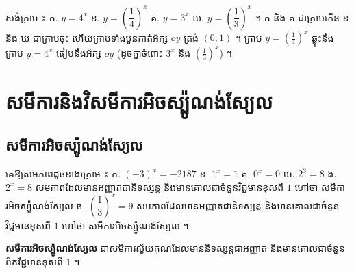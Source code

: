 \begin{pro}
សង់ក្រាប ៖ \quad ក. $y = 4^x$ \quad ខ. $y = \left(\dfrac{1}{4}\right)^x$ \quad គ. $y = 3^x$ \quad ឃ. $y = \left(\dfrac{1}{3}\right)^x$ ។
\ans
ក និង គ ជាក្រាបកើន ខ និង ឃ ជាក្រាបចុះ ហើយក្រាបទាំងបួនកាត់អ័ក្ស $oy$ ត្រង់ $(0, 1)$ ។ ក្រាប $y = \left(\frac{1}{4}\right)^x$ ឆ្លុះនឹងក្រាប $y = 4^x$ ធៀបនឹងអ័ក្ស $oy$ (ដូចគ្នាចំពោះ $3^x$ និង $\left(\frac{1}{3}\right)^x$) ។
\end{pro}

\section{សមីការនិងវិសមីការអិចស្ប៉ូណង់ស្យែល}
\subsection{សមីការអិចស្ប៉ូណង់ស្យែល}
\begin{example}[ឧទាហរណ៍]
គេឱ្យសមភាពដូចខាងក្រោម ៖ ក. $(-3)^x = -2187$ \quad ខ. $1^x = 1$ \quad គ. $0^x = 0$ \quad ឃ. $2^3 = 8$ \quad ង. $2^x = 8$ សមភាពដែលមានអញ្ញាតជានិទស្សន្ត និងមានគោលជាចំនួនវិជ្ជមានខុសពី $1$ ហៅថា សមីការអិចស្ប៉ូណង់ស្យែល \quad ច. $\left(\dfrac{1}{3}\right)^x = 9$ សមភាពដែលមានអញ្ញាតជានិទស្សន្ត និងមានគោលជាចំនួនវិជ្ជមានខុសពី $1$ ហៅថា សមីការអិចស្ប៉ូណង់ស្យែល ។
\end{example}
\begin{definition}[និយមន័យ]
\textbf{សមីការអិចស្ប៉ូណង់ស្យែល} ជាសមីការស្វ័យគុណដែលមាននិទស្សន្តជាអញ្ញាត និងមានគោលជាចំនួនពិតវិជ្ជមានខុសពី $1$ ។
\end{definition}

